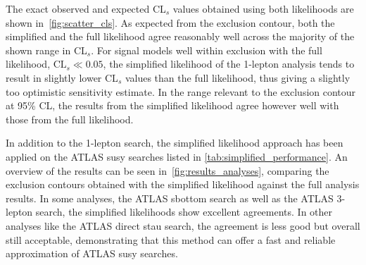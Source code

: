 The exact observed and expected CL$_s$ values obtained using both likelihoods are shown in~\cref{fig:scatter_cls}. As expected from the exclusion contour, both the simplified and the full likelihood agree reasonably well across the majority of the shown range in CL$_s$. For signal models well within exclusion with the full likelihood, \ie $\mathrm{CL}_s \ll 0.05$, the simplified likelihood of the 1-lepton analysis tends to result in slightly lower CL$_s$ values than the full likelihood, thus giving a slightly too optimistic sensitivity estimate. In the range relevant to the exclusion contour at 95\% CL, the results from the simplified likelihood agree however well with those from the full likelihood.

In addition to the 1-lepton search, the simplified likelihood approach has been applied on the ATLAS \gls{susy} searches listed in \cref{tab:simplified_performance}. An overview of the results can be seen in~\cref{fig:results_analyses}, comparing the exclusion contours obtained with the simplified likelihood against the full analysis results. In some analyses, \eg the ATLAS sbottom search as well as the ATLAS 3-lepton search, the simplified likelihoods show excellent agreements. In other analyses like \eg the ATLAS direct stau search, the agreement is less good but overall still acceptable, demonstrating that this method can offer a fast and reliable approximation of ATLAS \gls{susy} searches.


